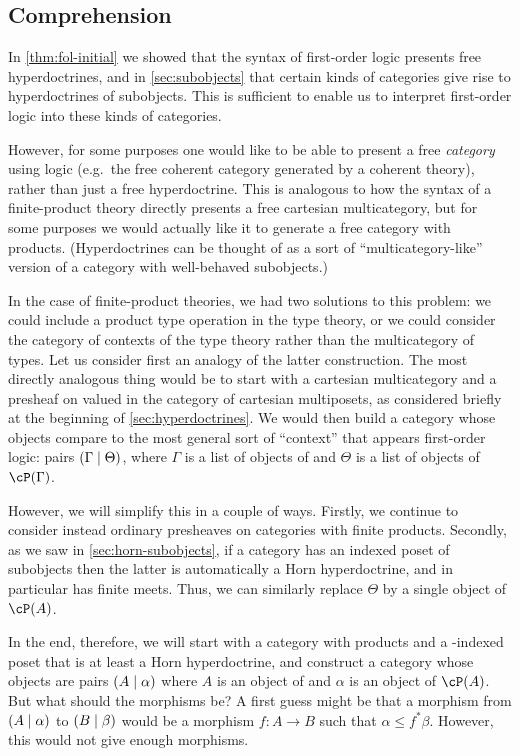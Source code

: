 \begin{wip}
\section{Comprehension}
\label{sec:comprehension}

In \cref{thm:fol-initial} we showed that the syntax of first-order logic presents free hyperdoctrines, and in \cref{sec:subobjects} that certain kinds of categories give rise to hyperdoctrines of subobjects.
This is sufficient to enable us to interpret first-order logic into these kinds of categories.

However, for some purposes one would like to be able to present a free \emph{category} using logic (e.g.\ the free coherent category generated by a coherent theory), rather than just a free hyperdoctrine.
This is analogous to how the syntax of a finite-product theory directly presents a free cartesian multicategory, but for some purposes we would actually like it to generate a free category with products.
(Hyperdoctrines can be thought of as a sort of ``multicategory-like'' version of a category with well-behaved subobjects.)

In the case of finite-product theories, we had two solutions to this problem: we could include a product type operation in the type theory, or we could consider the category of contexts of the type theory rather than the multicategory of types.
Let us consider first an analogy of the latter construction.
The most directly analogous thing would be to start with a cartesian multicategory \bS and a presheaf \cP on \bS valued in the category of cartesian multiposets, as considered briefly at the beginning of \cref{sec:hyperdoctrines}.
We would then build a category whose objects compare to the most general sort of ``context'' that appears first-order logic: pairs $(\Gamma\mid\Theta)$, where $\Gamma$ is a list of objects of \cS and $\Theta$ is a list of objects of $\cP(\Gamma)$.

However, we will simplify this in a couple of ways.
Firstly, we continue to consider instead ordinary presheaves on categories \cS with finite products.
Secondly, as we saw in \cref{sec:horn-subobjects}, if a category has an indexed poset of subobjects then the latter is automatically a Horn hyperdoctrine, and in particular has finite meets.
Thus, we can similarly replace $\Theta$ by a single object of $\cP(A)$.

In the end, therefore, we will start with a category \cS with products and a \cS-indexed poset \cP that is at least a Horn hyperdoctrine, and construct a category whose objects are pairs $(A\mid\alpha)$ where $A$ is an object of \cS and $\alpha$ is an object of $\cP(A)$.
But what should the morphisms be?
A first guess might be that a morphism from $(A\mid\alpha)$ to $(B\mid\beta)$ would be a morphism $f:A\to B$ such that $\alpha \le f^*\beta$.
However, this would not give enough morphisms.


\end{wip}
